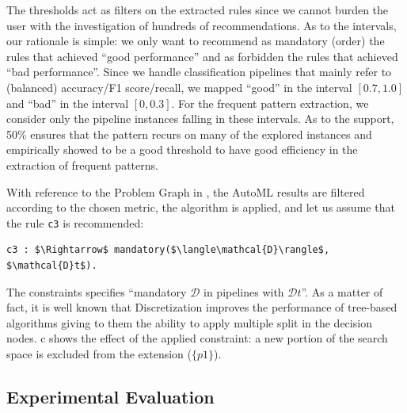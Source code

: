 The thresholds act as filters on the extracted rules since we cannot burden the user with the investigation of hundreds of recommendations. 
As to the intervals, our rationale is simple: we only want to recommend as mandatory (order) the rules that achieved ``good performance'' and as forbidden the rules that achieved ``bad performance''.
Since we handle classification pipelines that mainly refer to (balanced) accuracy/F1 score/recall, we mapped ``good'' in the interval $[0.7, 1.0]$ and ``bad'' in the interval $[0, 0.3]$. For the frequent pattern extraction, we consider only the pipeline instances falling in these intervals.
As to the support, 50\% ensures that the pattern recurs on many of the explored instances and empirically showed to be a good threshold to have good efficiency in the extraction of frequent patterns.

\begin{example}
With reference to the Problem Graph in ,
the AutoML results are filtered according to the chosen metric, the algorithm \cite{raschkas_2018_mlxtend} is applied, and let us assume that the rule \texttt{c3} is recommended:
\begin{lstlisting}[mathescape=true]
c3 : $\Rightarrow$ mandatory($\langle\mathcal{D}\rangle$, $\mathcal{D}t$).
\end{lstlisting}
The constraints specifies ``mandatory $\mathcal{D}$ in pipelines with $\mathcal{D}t$''.
As a matter of fact, it is well known that Discretization improves the performance of tree-based algorithms giving to them the ability to apply multiple split in the decision nodes.
c shows the effect of the applied constraint: a new portion of the search space is excluded from the extension ($\{p1\}$).
\end{example}


\subsection{Experimental Evaluation}\label{ssec:test}

